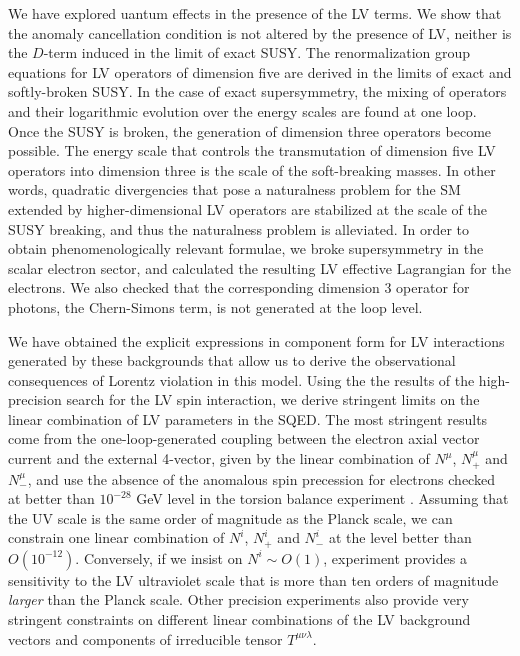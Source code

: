 \documentclass[12pt]{revtex4}
\begin{document}
We have explored uantum effects in the presence of the 
LV terms. We show that the anomaly cancellation condition 
is not altered by the presence of LV, neither is the $D$-term 
induced in the limit of exact SUSY. 
The renormalization group equations for LV operators of dimension five are derived 
in the limits of exact and softly-broken SUSY. In the case of exact supersymmetry, 
the mixing of operators and their logarithmic evolution over the energy scales are 
found at one loop. Once the SUSY is broken, the generation of dimension 
three operators become possible. The energy scale that controls the transmutation 
of dimension five LV operators into dimension three is the scale of the soft-breaking masses. 
In other words, quadratic divergencies that pose a naturalness problem for the 
SM extended by higher-dimensional LV operators are stabilized at the scale of the 
SUSY breaking, and thus the naturalness problem is alleviated. 
In order to obtain phenomenologically relevant formulae, we broke supersymmetry in the
scalar electron sector, and calculated the resulting LV effective Lagrangian for the 
electrons. We also checked that the corresponding dimension 3 operator for photons, 
the Chern-Simons term, is not generated at the loop level. 

We have obtained the explicit expressions in 
component form for LV interactions generated by these 
backgrounds that allow us to derive the observational consequences of Lorentz
violation in this model. Using the the results of the high-precision 
search for the LV spin interaction, we derive 
stringent limits on the linear combination of LV parameters in the 
SQED. The most stringent results come from the one-loop-generated 
coupling between the electron axial vector current and the external 
4-vector, given by the linear combination of $N^\mu$, $N^\mu_+$ and $N^{\mu}_-$,
 and use the absence of the anomalous spin precession for 
electrons checked at better than $10^{-28}$ GeV level in the 
torsion balance experiment \cite{Heckel:1999sy}. 
Assuming that the UV scale is the same order of magnitude as the Planck scale, 
we can constrain one linear combination of $N^i$, $N^i_+$ and $N^i_-$
at the level better than $O(10^{-12})$. Conversely, if we insist on $N^i \sim O(1)$, 
experiment \cite{Heckel:1999sy} provides a sensitivity to the LV ultraviolet scale that 
is more than ten orders of magnitude {\em larger} than the Planck scale. 
Other precision experiments \cite{clock1,clock2} also provide very stringent constraints on 
different linear combinations of the LV background vectors and components 
of irreducible tensor $T^{\mu\nu\lambda}$.
\end{document}
